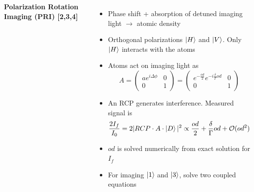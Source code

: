 \documentclass[26pt, paperwidth=36in,paperheight=48in]{tikzposter} %
\newcommand{\myfont}{\fontsize{26}{36}\selectfont}
\begin{document}
\begin{columns}
{} 








\block[roundedcorners=0]{\textcolor{BEC1blue}{Imaging Optically Dense Atomic Clouds}}
{
	\begin{minipage}{0.26\textwidth}
		\flushleft
		\vspace{0.5cm}
		\textbf{Polarization Rotation Imaging (PRI) [2,3,4]}
		\vspace{0.5cm}
		\myfont
		\begin{itemize}
		\item Phase shift + absorption of detuned imaging light $\rightarrow$ atomic density	
		\item Orthogonal polarizations $\ket{H}$ and $\ket{V}$. Only $\ket{H}$ interacts with the atoms
		\item Atoms act on imaging light as 
		$$ A = \left( \begin{array}{cc}  ae^{i\Delta \phi}  & 0 \\ 0 & 1 \end{array} \right)  = \left( \begin{array}{cc} 
			{e^{-\frac{od}{2}}}  
			{e^{-i \frac{\delta}{\Gamma}od}} 
			& 0 \\ 0 & 1 \end{array} \right) $$
			
		\item An RCP generates interference. Measured  signal is
			\begin{eqnarray*}
			\frac{2I_f}{I_0} = 2 | RCP \cdot A \cdot \ket{D}|^2 
			\propto \frac{od}{2} + \frac{\delta}{\Gamma} od + \mathcal{O}(od^2) 
			\end{eqnarray*}
			
		\item $od$ is solved numerically from exact solution for $I_f$ 
		\item For imaging $\ket{1}$ and $\ket{3}$, solve two coupled equations
		\end{itemize}
		

\end{minipage}}
\end{columns}
\end{document}
